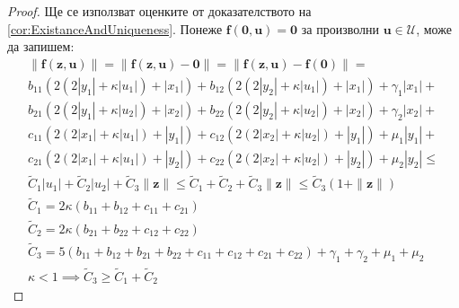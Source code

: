\begin{proof}
  Ще се използват оценките от доказателството на \eqref{cor:ExistanceAndUniqueness}.
  Понеже $\mathbf{f}(\mathbf{0}, \mathbf{u}) = \mathbf{0}$ за произволни $\mathbf{u} \in \mathscr{U}$, може да запишем:
  \begin{multline}
    \|\mathbf{f}(\mathbf{z}, \mathbf{u})\| = \|\mathbf{f}(\mathbf{z}, \mathbf{u}) - \mathbf{0}\| = \|\mathbf{f}(\mathbf{z}, \mathbf{u}) - \mathbf{f}(\mathbf{0})\| = \\
    b_{11} (2 (2 |y_1| + \kappa |u_1|) + |x_1|) + b_{12}(2  (2 |y_2| + \kappa |u_1|) +  |x_1|) + \gamma_1 |x_1| + \\
    b_{21} (2 (2|y_1| + \kappa |u_2|) + |x_2|) + b_{22} (2 (2|y_2| + \kappa |u_2|) + |x_2|) + \gamma_2 |x_2| + \\
    c_{11}(2  (2|x_1| +  \kappa |u_1|) +  |y_1|) + c_{12} (2 (2|x_2| + \kappa |u_2|) + |y_1|) + \mu_1 |y_1| + \\
    c_{21} (2  (2|x_1| + \kappa |u_1|) + |y_2|) + c_{22} (2 (2|x_2| + \kappa |u_2|) + |y_2|) + \mu_2 |y_2| \leq \\
    \tilde{C}_1|u_1| + \tilde{C}_2|u_2| + \tilde{C}_3 \|\mathbf{z}\| \leq \tilde{C}_1 + \tilde{C}_2 + \tilde{C}_3 \|\mathbf{z}\| \leq \tilde{C}_3(1 + \|\mathbf{z}\|) \\
    \tilde{C}_1 = 2 \kappa (b_{11} + b_{12} + c_{11} + c_{21}) \\
    \tilde{C}_2 = 2 \kappa (b_{21} + b_{22} + c_{12} + c_{22}) \\
    \tilde{C}_3 = 5 (b_{11} + b_{12} + b_{21} + b_{22} + c_{11} + c_{12} + c_{21} + c_{22}) + \gamma_1 + \gamma_2 + \mu_1 + \mu_2 \\
    \kappa < 1 \implies \tilde{C}_3 \geq \tilde{C}_1 + \tilde{C}_2
  \end{multline}

\end{proof}

